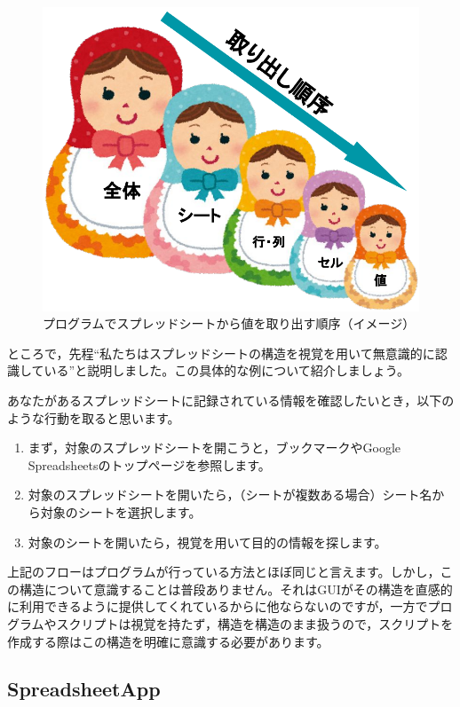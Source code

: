 \documentclass[uplatex,a4j]{jsarticle}
\begin{document}
\begin{figure}[H]
 \centering
 \includegraphics[keepaspectratio, scale=0.5]{images/spreadsheet_matryoshka.pdf}
 \caption{プログラムでスプレッドシートから値を取り出す順序（イメージ）}
 \label{fig:spreadsheet_matryoshka}
\end{figure}

ところで，先程``私たちはスプレッドシートの構造を視覚を用いて無意識的に認識している''と説明しました。この具体的な例について紹介しましょう。


あなたがあるスプレッドシートに記録されている情報を確認したいとき，以下のような行動を取ると思います。
\begin{enumerate}
\item まず，対象のスプレッドシートを開こうと，ブックマークやGoogle Spreadsheetsのトップページを参照します。
\item 対象のスプレッドシートを開いたら，（シートが複数ある場合）シート名から対象のシートを選択します。
\item 対象のシートを開いたら，視覚を用いて目的の情報を探します。
\end{enumerate}

上記のフローはプログラムが行っている方法とほぼ同じと言えます。しかし，この構造について意識することは普段ありません。それはGUIがその構造を直感的に利用できるように提供してくれているからに他ならないのですが，一方でプログラムやスクリプトは視覚を持たず，構造を構造のまま扱うので，スクリプトを作成する際はこの構造を明確に意識する必要があります。


\subsection{SpreadsheetApp}
\end{document}
